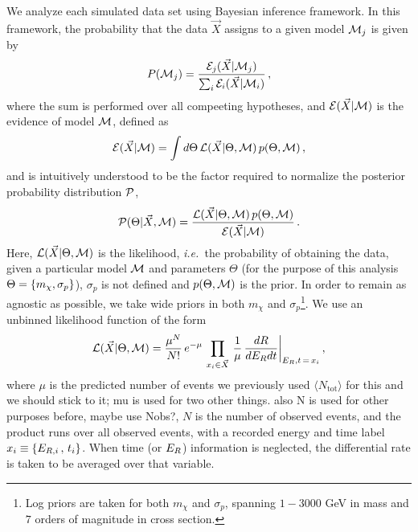 \documentclass[11pt]{article}
\newcommand{\ie}{{\it i.e.~}}  \newcommand{\eg}{{\it e.g.~}}
\newcommand{\vgColor}{magenta}
\newcommand{\vg}[1]{{\color{\vgColor} #1}}
\begin{document}
We analyze each simulated data set using Bayesian inference framework. In this framework, the probability that the data $\vec{X}$ assigns to a given model ${\cal M}_j$ is given by
\begin{equation}\label{eq:probs}
P({\cal M}_j) = \frac{{\cal E}_j(\vec{X}|{\cal M}_j)}{\sum_i {\cal E}_i(\vec{X}|{\cal M}_i)} \, ,
\end{equation}
where the sum is performed over all compeeting hypotheses, and ${\cal E}(\vec{X}|{\cal M})$ is the evidence of model ${\cal M}$, defined as
\begin{equation}\label{eq:evidence}
{\cal E}(\vec{X}|{\cal M}) = \int d\Theta \, {\cal L}(\vec{X}|\Theta,{\cal M}) \, p(\Theta,{\cal M}) \, ,
\end{equation}
and is intuitively understood to be the factor required to normalize the posterior probability distribution ${ \cal P}$,
\begin{equation}\label{eq:posterior}
{ \cal P}(\Theta | \vec{X}, {\cal M}) = \frac{{\cal L}(\vec{X}|\Theta,{\cal M})\, p(\Theta,{\cal M})}{{\cal E}(\vec{X}|{\cal M})} \, . 
\end{equation}
Here, ${\cal L}(\vec{X}|\Theta,{\cal M})$ is the likelihood, \ie the probability of obtaining the data, given a particular model ${\cal M}$ and parameters $\Theta$ (for the purpose of this analysis $\Theta = \left\{ m_\chi, \sigma_p \right\}$), \vg{$\sigma_p$ is not defined} and $p(\Theta, {\cal M})$ is the prior. In order to remain as agnostic as possible, we take wide priors in both $m_\chi$ and $\sigma_p$\footnote{Log priors are taken for both $m_\chi$ and $\sigma_p$, spanning $1-3000$ GeV in mass and $7$ orders of magnitude in cross section.}. We use an unbinned likelihood function of the form
\begin{equation}\label{eq:likelihood}
{\cal L}(\vec{X}|\Theta,{\cal M}) = \frac{\mu^N}{N!} \, e^{-\mu} \, \prod_{x_i \in \vec{X}}\, \frac{1}{\mu} \, \frac{dR}{dE_R dt} \bigg|_{E_R,t \, = \, x_i} \, ,
\end{equation}
where $\mu$ is the predicted number of events \vg{we previously used $\langle N_\mathrm{tot}\rangle$ for this and we should stick to it; mu is used for two other things. also N is used for other purposes before, maybe use Nobs?}, $N$ is the number of observed events, and the product runs over all observed events, with a recorded energy and time label $x_i \equiv \left\{ E_{R,i} \, , \, t_i \right\}$. When time (or $E_R$) information is neglected, the differential rate is taken to be averaged over that variable. 
\end{document}
